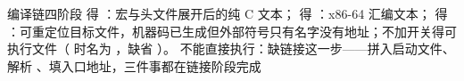 \begin{chapteranswer}{编译链四阶段}
 得 ：宏与头文件展开后的纯 C 文本； 得 ：x86-64 汇编文本； 得 ：可重定位目标文件，机器码已生成但外部符号只有名字没有地址；不加开关得可执行文件（ 时名为 ，缺省 ）。 不能直接执行：缺链接这一步——拼入启动文件、解析 、填入口地址，三件事都在链接阶段完成
\end{chapteranswer}
